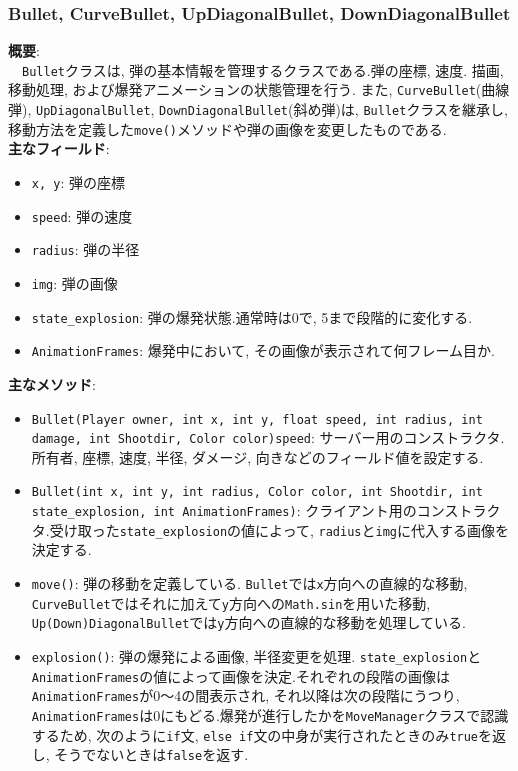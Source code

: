 \documentclass[11pt,a4j]{jarticle}
\begin{document}
\subsubsection{Bullet, CurveBullet, UpDiagonalBullet, DownDiagonalBullet}
\noindent\textbf{概要}: \\
　\texttt{Bullet}クラスは, 弾の基本情報を管理するクラスである.弾の座標, 速度. 描画, 移動処理, および爆発アニメーションの状態管理を行う.
また, \texttt{CurveBullet}(曲線弾), \texttt{UpDiagonalBullet}, \texttt{DownDiagonalBullet}(斜め弾)は, \texttt{Bullet}クラスを継承し, 移動方法を定義した\texttt{move()}メソッドや弾の画像を変更したものである.\\
\noindent\textbf{主なフィールド}:
\begin{itemize}
  \item \texttt{x, y}: 弾の座標
  \item \texttt{speed}: 弾の速度
  \item \texttt{radius}: 弾の半径
  \item \texttt{img}: 弾の画像
  \item \texttt{state\_explosion}: 弾の爆発状態.通常時は0で, 5まで段階的に変化する.
  \item \texttt{AnimationFrames}: 爆発中において, その画像が表示されて何フレーム目か.
\end{itemize}
\noindent\textbf{主なメソッド}:
\begin{itemize}
  \item \texttt{Bullet(Player owner, int x, int y, float speed, int radius, int damage, int Shootdir, Color color)speed}: サーバー用のコンストラクタ.所有者, 座標, 速度, 半径, ダメージ, 向きなどのフィールド値を設定する.
  \item \texttt{Bullet(int x, int y, int radius, Color color, int Shootdir, int state\_explosion, int AnimationFrames)}: クライアント用のコンストラクタ.受け取った\texttt{state\_explosion}の値によって, \texttt{radius}と\texttt{img}に代入する画像を決定する.
  \item \texttt{move()}: 弾の移動を定義している. \texttt{Bullet}では\texttt{x}方向への直線的な移動, \texttt{CurveBullet}ではそれに加えて\texttt{y}方向への\texttt{Math.sin}を用いた移動, \texttt{Up(Down)DiagonalBullet}では\texttt{y}方向への直線的な移動を処理している.
  \item \texttt{explosion()}: 弾の爆発による画像, 半径変更を処理. \texttt{state\_explosion}と\texttt{AnimationFrames}の値によって画像を決定.それぞれの段階の画像は\texttt{AnimationFrames}が0～4の間表示され, それ以降は次の段階にうつり, \texttt{AnimationFrames}は0にもどる.爆発が進行したかを\texttt{MoveManager}クラスで認識するため, 次のように\texttt{if}文, \texttt{else if}文の中身が実行されたときのみ\texttt{true}を返し, そうでないときは\texttt{false}を返す.
\end{itemize}
\end{document}
